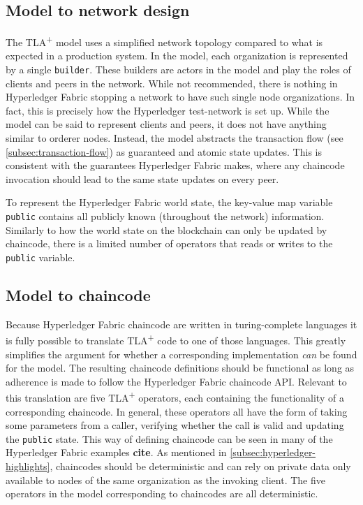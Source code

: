 \documentclass[english, biblatex, digitaloutput]{kththesis}
\begin{document}
\subsection{Model to network design}
The TLA\textsuperscript+ model uses a simplified network topology compared to what is expected in a production system. In the model, each organization is represented by a single \texttt{builder}. These builders are actors in the model and play the roles of clients and peers in the network. While not recommended, there is nothing in Hyperledger Fabric stopping a network to have such single node organizations. In fact, this is precisely how the Hyperledger test-network is set up. While the model can be said to represent clients and peers, it does not have anything similar to orderer nodes. Instead, the model abstracts the transaction flow (see \ref{subsec:transaction-flow}) as guaranteed and atomic state updates. This is consistent with the guarantees Hyperledger Fabric makes, where any chaincode invocation should lead to the same state updates on every peer.

To represent the Hyperledger Fabric world state, the key-value map variable \texttt{public} contains all publicly known (throughout the network) information. Similarly to how the world state on the blockchain can only be updated by chaincode, there is a limited number of operators that reads or writes to the \texttt{public} variable.

\subsection{Model to chaincode}

Because Hyperledger Fabric chaincode are written in turing-complete languages it is fully possible to translate TLA\textsuperscript+ code to one of those languages. This greatly simplifies the argument for whether a corresponding implementation \textit{can} be found for the model. The resulting chaincode definitions should be functional as long as adherence is made to follow the Hyperledger Fabric chaincode API. Relevant to this translation are five TLA\textsuperscript+ operators, each containing the functionality of a corresponding chaincode. In general, these operators all have the form of taking some parameters from a caller, verifying whether the call is valid and updating the \texttt{public} state. This way of defining chaincode can be seen in many of the Hyperledger Fabric examples \textbf{cite}. As mentioned in \ref{subsec:hyperledger-highlights}, chaincodes should be deterministic and can rely on private data only available to nodes of the same organization as the invoking client. The five operators in the model corresponding to chaincodes are all deterministic.
\end{document}

